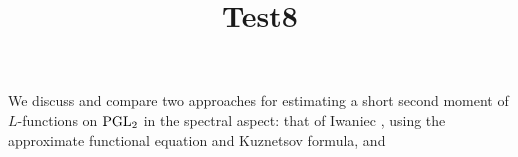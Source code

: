 \documentclass[reqno]{amsart} 
\title{Test8}
\numberwithin{equation}{section}
\numberwithin{theorem}{section}
\begin{document}
\maketitle
\tableofcontents


We discuss and compare two approaches for estimating a short second moment of $L$-functions on $\operatorname{PGL}_2$ in the spectral aspect: that of Iwaniec \cite{Iwaniec1992}, using the approximate functional equation and Kuznetsov formula, and




{} 
\end{document}

